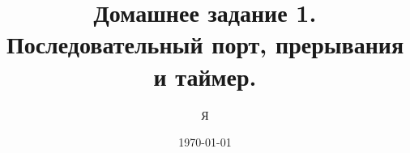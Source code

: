 \documentclass[12pt,a4paper,oneside]{article}
\title{Домашнее задание 1. \\ Последовательный порт, прерывания и таймер.}
\author{Я}
\date{\today}
\begin{document}
  \sloppy
  \maketitle
  \tableofcontents
  \clearpage

  
  
  
  
  
  
  
  

  {}
  
\end{document}
